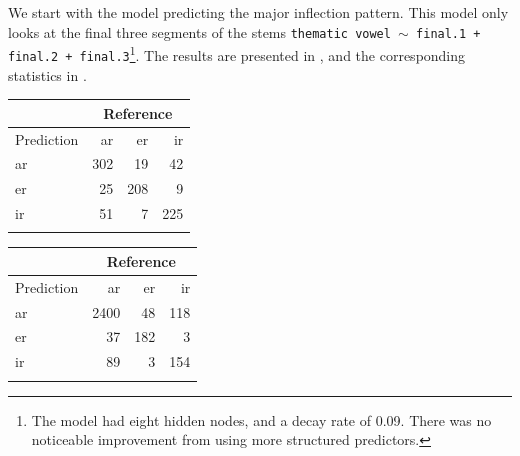 We start with the model predicting the major inflection pattern. This model only looks at the final three segments of the stems \texttt{thematic vowel $\sim$ final.1 + final.2 + final.3}\footnote{The model had eight hidden nodes, and a decay rate of 0.09. There was no noticeable improvement from using more structured predictors.}. The results are presented in , and the corresponding statistics in .

\begin{minipage}{0.49\textwidth}
    \captionsetup{width=.8\linewidth}
    \centering
    \flushleft
    \begin{tabular}{lrrr}
      \lsptoprule
      & \multicolumn{3}{c}{Reference} \\
      \midrule
      Prediction & ar  & er  & ir                \\
      ar         & 302 & 19  & 42                \\
      er         & 25  & 208 & 9                 \\
      ir         & 51  & 7   & 225               \\
      \lspbottomrule
    \end{tabular}
    \label{tab:spanish-verbs-theme-v}
\end{minipage}%
\begin{minipage}{0.49\textwidth}
    \captionsetup{width=.8\linewidth}
    \begin{tabular}{lrrr}
      \lsptoprule
      & \multicolumn{3}{c}{Reference} \\
      \midrule
      Prediction & ar   & er  & ir               \\
      ar         & 2400 & 48  & 118              \\
      er         & 37   & 182 & 3                \\
      ir         & 89   & 3   & 154              \\
      \lspbottomrule
    \end{tabular}
    \label{tab:spanish-verbs-theme-v-2}
\end{minipage}

